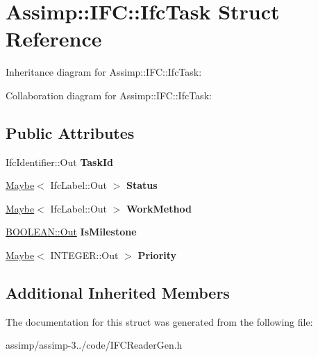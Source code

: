 \hypertarget{struct_assimp_1_1_i_f_c_1_1_ifc_task}{\section{Assimp\+:\+:I\+F\+C\+:\+:Ifc\+Task Struct Reference}
\label{struct_assimp_1_1_i_f_c_1_1_ifc_task}
}


Inheritance diagram for Assimp\+:\+:I\+F\+C\+:\+:Ifc\+Task\+:


Collaboration diagram for Assimp\+:\+:I\+F\+C\+:\+:Ifc\+Task\+:
\subsection*{Public Attributes}
\begin{DoxyCompactItemize}
\item 
\hypertarget{struct_assimp_1_1_i_f_c_1_1_ifc_task_af9f371614e7c775f55ca1c148a808004}{Ifc\+Identifier\+::\+Out {\bfseries Task\+Id}}\label{struct_assimp_1_1_i_f_c_1_1_ifc_task_af9f371614e7c775f55ca1c148a808004}

\item 
\hypertarget{struct_assimp_1_1_i_f_c_1_1_ifc_task_a19e641bc6e41309587522d9e08d9a37b}{\hyperlink{struct_assimp_1_1_s_t_e_p_1_1_maybe}{Maybe}$<$ Ifc\+Label\+::\+Out $>$ {\bfseries Status}}\label{struct_assimp_1_1_i_f_c_1_1_ifc_task_a19e641bc6e41309587522d9e08d9a37b}

\item 
\hypertarget{struct_assimp_1_1_i_f_c_1_1_ifc_task_ac3ed2b82dacf9c8a0edb2d2e45281505}{\hyperlink{struct_assimp_1_1_s_t_e_p_1_1_maybe}{Maybe}$<$ Ifc\+Label\+::\+Out $>$ {\bfseries Work\+Method}}\label{struct_assimp_1_1_i_f_c_1_1_ifc_task_ac3ed2b82dacf9c8a0edb2d2e45281505}

\item 
\hypertarget{struct_assimp_1_1_i_f_c_1_1_ifc_task_a759f97ecd11cf9e39c39a4bf5df54077}{\hyperlink{classboost_1_1shared__ptr}{B\+O\+O\+L\+E\+A\+N\+::\+Out} {\bfseries Is\+Milestone}}\label{struct_assimp_1_1_i_f_c_1_1_ifc_task_a759f97ecd11cf9e39c39a4bf5df54077}

\item 
\hypertarget{struct_assimp_1_1_i_f_c_1_1_ifc_task_a9a7e3e0923c45ca02942e8e8921b7ef1}{\hyperlink{struct_assimp_1_1_s_t_e_p_1_1_maybe}{Maybe}$<$ I\+N\+T\+E\+G\+E\+R\+::\+Out $>$ {\bfseries Priority}}\label{struct_assimp_1_1_i_f_c_1_1_ifc_task_a9a7e3e0923c45ca02942e8e8921b7ef1}

\end{DoxyCompactItemize}
\subsection*{Additional Inherited Members}


The documentation for this struct was generated from the following file\+:\begin{DoxyCompactItemize}
\item 
assimp/assimp-\/3../code/I\+F\+C\+Reader\+Gen.\+h\end{DoxyCompactItemize}
